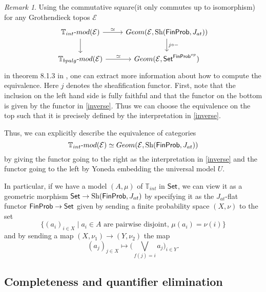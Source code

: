 \documentclass[a4paper]{amsproc}
\theoremstyle{plain}
\theoremstyle{definition}
\theoremstyle{remark}
\newtheorem{remark}[theorem]{Remark}
\numberwithin{equation}{section}
\DeclareMathOperator{\Sh}{Sh}
\newcommand{\Set}{\textup{\textsf{Set}}}
\newcommand{\FinProb}{\textup{\textsf{FinProb}}}
\begin{document}
\begin{remark} \label{classifying_equiv_data}
Using the commutative square(it only commutes up to isomorphism) for any Grothendieck topos $\mathcal{E}$
\[
\begin{tikzcd}
\mathbb{T}_{int}\text{-}mod(\mathcal{E}) \arrow[d] \arrow[r, "\simeq"] & {Geom(\mathcal{E},\Sh(\FinProb,J_{at}))} \arrow[d, "j \circ -"] \\
\mathbb{T}_{bpalg}\text{-}mod(\mathcal{E}) \arrow[r, "\simeq"]         & {Geom(\mathcal{E},\Set^{\FinProb^{op}})}
\end{tikzcd}
\]
in theorem 8.1.3 in \cite{caramello_book}, one can extract more information about how to compute the equivalence. Here $j$ denotes the sheafification functor. First, note that the inclusion on the left hand side is fully faithful and that the functor on the bottom is given by the functor in \ref{inverse}. Thus we can choose the equivalence on the top such that it is precisely defined by the interpretation in \ref{inverse}.

Thus, we can explicitly describe the equivalence of categories
\[
    \mathbb{T}_{int}\text{-}mod(\mathcal{E}) \simeq Geom(\mathcal{E},\Sh(\FinProb,J_{at}))
\]
by giving the functor going to the right as the interpretation in \ref{inverse} and the functor going to the left by Yoneda embedding the universal model $U$.

In particular, if we have a model $(A,\mu)$ of $\mathbb{T}_{int}$ in $\Set$, we can view it as a geometric morphism $\Set \to \Sh(\FinProb, J_{at})$ by specifying it as the $J_{at}$-flat functor $\FinProb \to \Set$ given by sending a finite probability space $(X,\nu)$ to the set
\[
\{(a_i)_{i \in X} \mid a_i \in A \text{ are pairwise disjoint, } \mu(a_i) = \nu(i) \}
\]
and by sending a map $(X,\nu_1) \to (Y,\nu_2)$ the map
\[
(a_j)_{j \in X} \mapsto \big (\bigvee_{f(j) = i} a_j \big )_{i \in Y} .
\]
\end{remark}


\subsection{Completeness and quantifier elimination}
\end{document}
